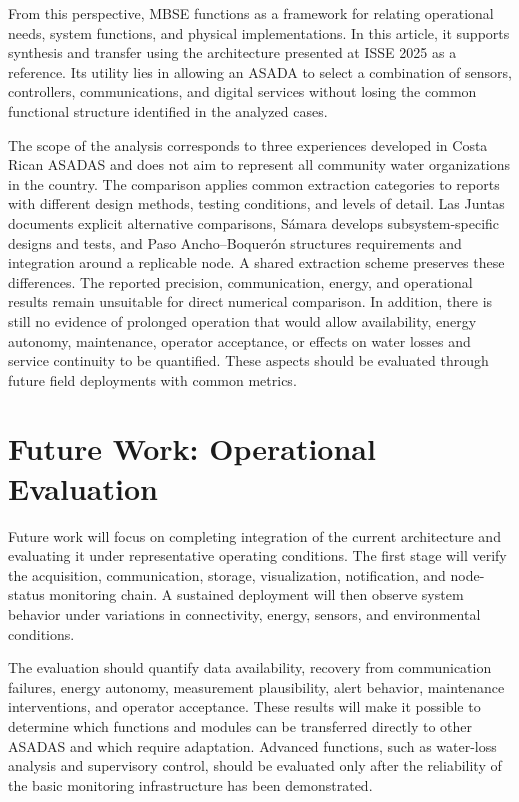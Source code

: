 \documentclass[conference]{IEEEtran}
\begin{document}
From this perspective, MBSE functions as a framework for relating operational needs, system functions, and physical implementations. In this article, it supports synthesis and transfer using the architecture presented at ISSE 2025 as a reference. Its utility lies in allowing an ASADA to select a combination of sensors, controllers, communications, and digital services without losing the common functional structure identified in the analyzed cases.

The scope of the analysis corresponds to three experiences developed in Costa Rican ASADAS and does not aim to represent all community water organizations in the country. The comparison applies common extraction categories to reports with different design methods, testing conditions, and levels of detail. Las Juntas documents explicit alternative comparisons, S\'{a}mara develops subsystem-specific designs and tests, and Paso Ancho--Boquer\'{o}n structures requirements and integration around a replicable node. A shared extraction scheme preserves these differences. The reported precision, communication, energy, and operational results remain unsuitable for direct numerical comparison. In addition, there is still no evidence of prolonged operation that would allow availability, energy autonomy, maintenance, operator acceptance, or effects on water losses and service continuity to be quantified. These aspects should be evaluated through future field deployments with common metrics.

\section{Future Work: Operational Evaluation}

Future work will focus on completing integration of the current architecture and evaluating it under representative operating conditions. The first stage will verify the acquisition, communication, storage, visualization, notification, and node-status monitoring chain. A sustained deployment will then observe system behavior under variations in connectivity, energy, sensors, and environmental conditions.

The evaluation should quantify data availability, recovery from communication failures, energy autonomy, measurement plausibility, alert behavior, maintenance interventions, and operator acceptance. These results will make it possible to determine which functions and modules can be transferred directly to other ASADAS and which require adaptation. Advanced functions, such as water-loss analysis and supervisory control, should be evaluated only after the reliability of the basic monitoring infrastructure has been demonstrated.
\end{document}
